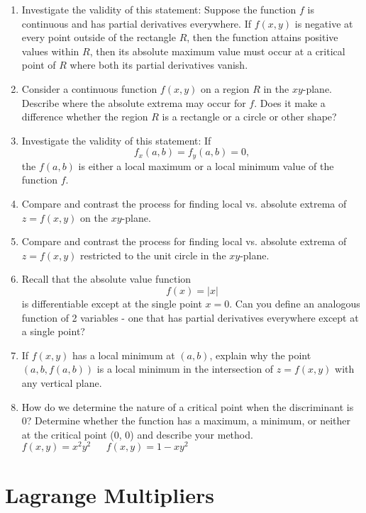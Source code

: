 \begin{enumerate}
\item  Investigate the validity of this statement:  Suppose the function $f$ is continuous and has partial derivatives everywhere.  If $f(x,y)$ is negative at every point outside of the rectangle $R$, then the function attains positive values within $R$, then its absolute maximum value must occur at a critical point of $R$ where both its partial derivatives vanish.

\item  Consider a continuous function $f(x,y)$ on a region $R$ in the $xy$-plane.  Describe where the absolute extrema may occur for $f$.  Does it make a difference whether the region $R$ is a rectangle or a circle or other shape?

\item  Investigate the validity of this statement:  If $$f_x \left( {a,b} \right) = f_y \left( {a,b} \right) = 0,$$ the $f(a, b)$ is either a local maximum or a local minimum value of the function $f$.

\item  Compare and contrast the process for finding local vs. absolute extrema of $z = f(x,y)$ on the $xy$-plane. 

\item  Compare and contrast the process for finding local vs. absolute extrema of $z = f(x,y)$ restricted to the unit circle in the $xy$-plane. 

\item  Recall that the absolute value function $$f(x) = \left| x \right|$$ is differentiable except at the single point $x = 0$.  Can you define an analogous function of 2 variables - one that has partial derivatives everywhere except at a single point?  \cite{EP}

\item  If $f(x,y)$ has a local minimum at $(a, b)$, explain why the point $(a, b, f(a, b))$ is a local minimum in the intersection of $z = f(x,y)$ with any vertical plane.  \cite{SM}

\item  How do we determine the nature of a critical point when the discriminant is 0?  Determine whether the function has a maximum, a minimum, or neither at the critical point (0, 0) and describe your method.
$f(x,y) = x ^2y^2 \ \ \ \ \ \ \ f(x,y) = 1 - xy^2$  \cite{FWG} \end{enumerate}\section{Lagrange Multipliers}\begin{enumerate}


\end{enumerate}
